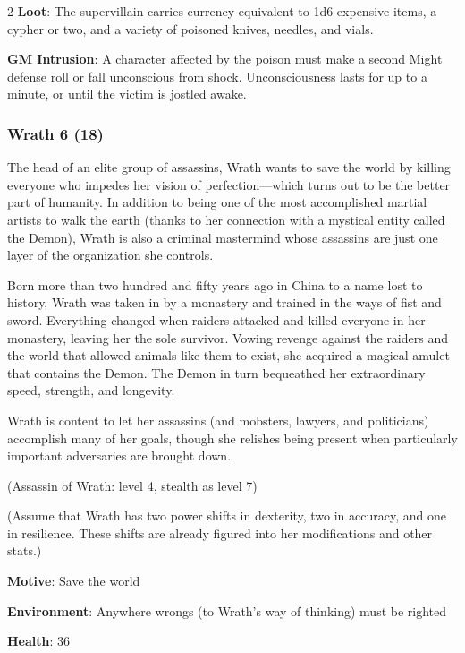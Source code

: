 \begin{multicols}{2}
\textbf{Loot}: The supervillain carries currency equivalent to 1d6 expensive items, a cypher or two, and a variety of poisoned knives, needles, and vials.

\textbf{GM Intrusion}: A character affected by the poison must make a second Might defense roll or fall unconscious from shock. Unconsciousness lasts for up to a minute, or until the victim is jostled awake.

\subsubsection{Wrath	6 (18)}

The head of an elite group of assassins, Wrath wants to save the world by killing everyone who impedes her vision of perfection—which turns out to be the better part of humanity. In addition to being one of the most accomplished martial artists to walk the earth (thanks to her connection with a mystical entity called the Demon), Wrath is also a criminal mastermind whose assassins are just one layer of the organization she controls.

Born more than two hundred and fifty years ago in China to a name lost to history, Wrath was taken in by a monastery and trained in the ways of fist and sword. Everything changed when raiders attacked and killed everyone in her monastery, leaving her the sole survivor. Vowing revenge against the raiders and the world that allowed animals like them to exist, she acquired a magical amulet that contains the Demon. The Demon in turn bequeathed her extraordinary speed, strength, and longevity.

Wrath is content to let her assassins (and mobsters, lawyers, and politicians) accomplish many of her goals, though she relishes being present when particularly important adversaries are brought down.

(Assassin of Wrath: level 4, stealth as level 7)

(Assume that Wrath has two power shifts in dexterity, two in accuracy, and one in resilience. These shifts are already figured into her modifications and other stats.)

\textbf{Motive}: Save the world

\textbf{Environment}: Anywhere wrongs (to Wrath’s way of thinking) must be righted

\textbf{Health}: 36


\end{multicols}
